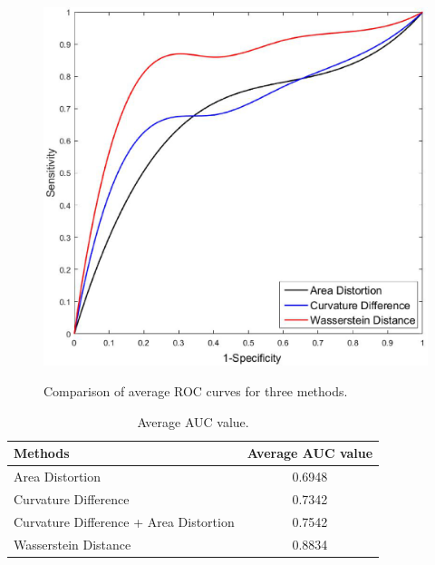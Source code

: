 \documentclass{beamer}
\theoremstyle{definition}
\begin{document}
\begin{frame}

\begin{figure}
\centering
\begin{minipage}[!t]{0.6\textwidth}
\centering
	\includegraphics[width=\textwidth]{figs/ROC1.eps}
	\caption{Comparison of average ROC curves for three methods.}\vspace{3em}
	\label{fig:ROC1}
\end{minipage}%
\end{figure}


\end{frame}





\begin{frame}


\begin{table}
\centering
\caption{Average AUC value.}
\label{tbl:ROC}
\begin{tabular}[\textwidth]{@{\extracolsep{\fill}}lc}
\hline
Methods & Average AUC value\\
\hline
Area Distortion& 0.6948 \\
Curvature Difference & 0.7342\\
Curvature Difference + Area Distortion & 0.7542\\
Wasserstein Distance & 0.8834\\
\hline
\end{tabular}
\end{table}




\end{frame}
\end{document}
